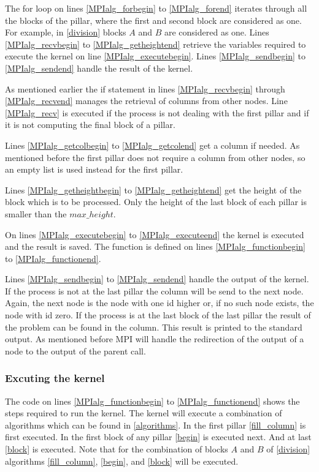 The for loop on lines \ref{MPIalg_forbegin} to \ref{MPIalg_forend} iterates through all the blocks of the pillar, where the first and second block are considered as one.
For example, in \cref{division} blocks $A$ and $B$ are considered as one.
Lines \ref{MPIalg_recvbegin} to \ref{MPIalg_getheightend} retrieve the variables required to execute the kernel on line \ref{MPIalg_executebegin}.
Lines \ref{MPIalg_sendbegin} to \ref{MPIalg_sendend} handle the result of the kernel.

As mentioned earlier the if statement in lines \ref{MPIalg_recvbegin} through \ref{MPIalg_recvend} manages the retrieval of columns from other nodes.
Line \ref{MPIalg_recv} is executed if the process is not dealing with the first pillar and if it is not computing the final block of a pillar.

Lines \ref{MPIalg_getcolbegin} to \ref{MPIalg_getcolend} get a column if needed.
As mentioned before the first pillar does not require a column from other nodes, so an empty list is used instead for the first pillar.

Lines \ref{MPIalg_getheightbegin} to \ref{MPIalg_getheightend} get the height of the block which is to be processed.
Only the height of the last block of each pillar is smaller than the $max\_height$.

On lines \ref{MPIalg_executebegin} to \ref{MPIalg_executeend} the kernel is executed and the result is saved.
The function is defined on lines \ref{MPIalg_functionbegin} to \ref{MPIalg_functionend}.

Lines \ref{MPIalg_sendbegin} to \ref{MPIalg_sendend} handle the output of the kernel.
If the process is not at the last pillar the column will be send to the next node.
Again, the next node is the node with one id higher or, if no such node exists, the node with id zero.
If the process is at the last block of the last pillar the result of the problem can be found in the column.
This result is printed to the standard output.
As mentioned before MPI will handle the redirection of the output of a node to the output of the parent call.

\subsubsection{Excuting the kernel}
The code on lines \ref{MPIalg_functionbegin} to \ref{MPIalg_functionend} shows the steps required to run the kernel.
The kernel will execute a combination of algorithms which can be found in \cref{algorithms}.
In the first pillar \cref{fill_column} is first executed.
In the first block of any pillar \cref{begin} is executed next.
And at last \cref{block} is executed.
Note that for the combination of blocks $A$ and $B$ of \cref{division} algorithms \ref{fill_column}, \ref{begin}, and \ref{block} will be executed.

